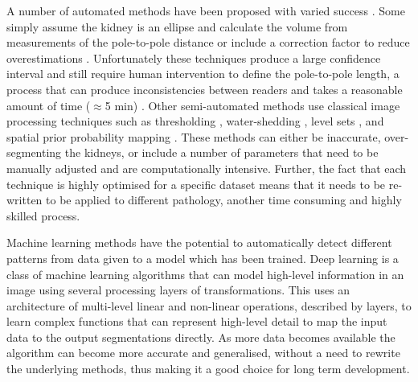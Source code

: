A number of automated methods have been proposed with varied success \cite{zollner_assessment_2012}. Some simply assume the kidney is an ellipse and calculate the volume from measurements of the pole-to-pole distance \cite{cheong_normal_2007, spithoven_estimation_2015} or include a correction factor to reduce overestimations \cite{seuss_development_2017}. Unfortunately these techniques produce a large confidence interval and still require human intervention to define the pole-to-pole length, a process that can produce inconsistencies between readers and takes a reasonable amount of time ($\approx$5 min) \cite{magistroni_review_2018}. Other semi-automated methods use classical image processing techniques such as thresholding \cite{coulam_measurement_2002}, water-shedding \cite{karstoft_different_2007}, level sets \cite{simms_rapid_2019, gloger_prior_2012}, and spatial prior probability mapping \cite{kim_automated_2016}. These methods can either be inaccurate, over-segmenting the kidneys, or include a number of parameters that need to be manually adjusted and are computationally intensive. Further, the fact that each technique is highly optimised for a specific dataset means that it needs to be re-written to be applied to different pathology, another time consuming and highly skilled process.

Machine learning methods have the potential to automatically detect different patterns from data given to a model which has been trained. Deep learning is a class of machine learning algorithms that can model high-level information in an image using several processing layers of transformations. This uses an architecture of multi-level linear and non-linear operations, described by layers, to learn complex functions that can represent high-level detail to map the input data to the output segmentations directly. As more data becomes available the algorithm can become more accurate and generalised, without a need to rewrite the underlying methods, thus making it a good choice for long term development. 

